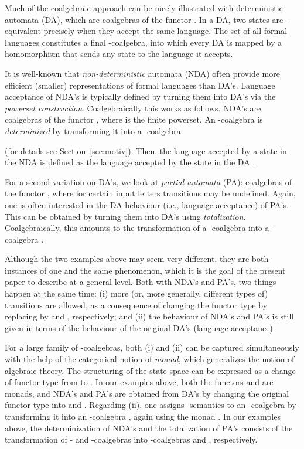 \documentclass{LMCS}
\begin{document}
Much of the coalgebraic approach can be nicely illustrated with
deterministic automata (DA), which are coalgebras of the functor
\mbox{}. In a DA, two states are -equivalent
precisely when they accept the same language. The set  of
all formal languages constitutes a final -coalgebra, into which
every DA is mapped by a homomorphism that sends any state to the
language it accepts.

It is well-known that \emph{non-deterministic} automata (NDA)
often provide more efficient (smaller) representations of
formal languages than DA's. Language acceptance of NDA's is typically
defined by turning them into DA's via the \emph{powerset construction}.
Coalgebraically this works as follows.
NDA's are coalgebras of the functor , where
 is the finite powerset. An -coalgebra 
is \emph{determinized} by transforming it into a -coalgebra

(for details see Section~\ref{sec:motiv}).
Then, the language accepted by a state  in the NDA 
is defined as the language accepted by the state  in the DA
.

For a second variation on DA's, we look at
\emph{partial automata} (PA): coalgebras of the functor
, where for certain input letters
transitions may be undefined. Again, one is often interested
in the DA-behaviour (i.e., language acceptance) of PA's. This
can be obtained  by turning them into DA's using \emph{totalization}.
Coalgebraically, this amounts to the transformation of a -coalgebra
 into a -coalgebra
.

Although the two examples above may seem very different, they
are both instances of one and the same phenomenon, which it is
the goal of the present paper to describe at a general level.
Both with NDA's and PA's, two things happen at the
same time: (i) more (or, more generally, different types of)
transitions are allowed, as a consequence of changing
the functor type by replacing  by  and , respectively;
and (ii) the behaviour of NDA's and PA's is still given in
terms of the behaviour of the original DA's (language acceptance).

For a large family of -coalgebras, both (i) and (ii) can be
captured simultaneously with the help of the categorical
notion of \emph{monad}, which generalizes the notion of algebraic theory.
The structuring of the state space  can be expressed as a change of
functor type from  to . In our examples above, both the functors
 and  are monads,
and NDA's and PA's are obtained from DA's by changing the
original functor type  into  and .
Regarding (ii), one assigns -semantics to an -coalgebra
  by transforming it into an -coalgebra ,
again using the monad . In our examples above,
the determinization of NDA's and the totalization of PA's
consists of the transformation of  - and -coalgebras
 into -coalgebras  and ,
respectively.
\end{document}
